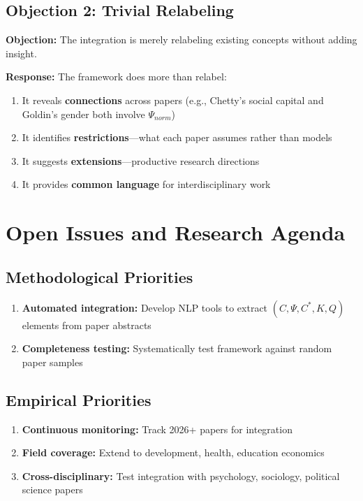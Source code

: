 \subsection{Objection 2: Trivial Relabeling}

\textbf{Objection:} The integration is merely relabeling existing concepts
without adding insight.

\textbf{Response:} The framework does more than relabel:
\begin{enumerate}
    \item It reveals \textbf{connections} across papers (e.g., Chetty's
          social capital and Goldin's gender both involve $\Psi_{norm}$)
    \item It identifies \textbf{restrictions}---what each paper assumes
          rather than models
    \item It suggests \textbf{extensions}---productive research directions
    \item It provides \textbf{common language} for interdisciplinary work
\end{enumerate}


\section{Open Issues and Research Agenda}
\label{sec:J-open}

\subsection{Methodological Priorities}

\begin{enumerate}
    \item \textbf{Automated integration:} Develop NLP tools to extract
        $(C, \Psi, C^*, K, Q)$ elements from paper abstracts
    \item \textbf{Completeness testing:} Systematically test framework
        against random paper samples
\end{enumerate}

\subsection{Empirical Priorities}

\begin{enumerate}
    \item \textbf{Continuous monitoring:} Track 2026+ papers for integration
    \item \textbf{Field coverage:} Extend to development, health, education
        economics
    \item \textbf{Cross-disciplinary:} Test integration with psychology,
        sociology, political science papers
\end{enumerate}


